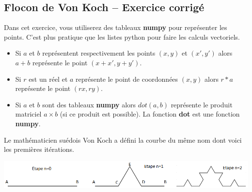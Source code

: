 \subsection*{Flocon de Von Koch -- Exercice corrigé}



Dans cet exercice, vous utiliserez des tableaux \textbf{numpy} pour représenter les points. C'est plus pratique que les 
listes python pour faire les calculs vectoriels.

\begin{itemize}
\item Si $a$ et $b$ représentent respectivement les points $(x,y)$ et $(x',y')$ alors $a+b$ représente le point 
$(x+x',y+y')$.
\item Si $r$ est un réel et $a$ représente le point de coordonnées $(x,y)$ alors $r*a$ représente le point $(rx,ry)$.
\item Si $a$ et $b$ sont des tableaux \textbf{numpy} alors $dot(a,b)$ représente le produit matriciel $a\times b$ (si ce 
produit est possible). La fonction \textbf{dot} est une fonction \textbf{numpy}.
\end{itemize}

Le mathématicien suédois Von Koch a défini la courbe du même nom dont voici les premières itérations.

\begin{center}
\includegraphics[width=.95\linewidth]{images/etapes_flocon}
\end{center}







